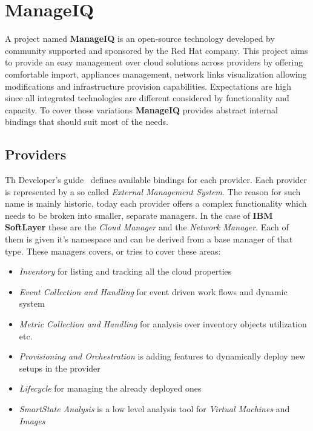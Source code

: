 \chapter{ManageIQ}
\label{chap:ManageIQ}

A project named \textbf{ManageIQ} is an open-source technology developed by community supported and sponsored by the Red Hat company. This project aims to provide an easy management over cloud solutions across providers by offering comfortable import, appliances management, network links visualization allowing modifications and infrastructure provision capabilities. Expectations are high since all integrated technologies are different considered by functionality and capacity. To cover those variations \textbf{ManageIQ} provides abstract internal bindings that should suit most of the needs.

\section{Providers}
\label{sec:Providers}

Th Developer's guide~\cite{manageiq_dev} defines available bindings for each provider. Each provider is represented by a so called \emph{External Management System}. The reason for such name is mainly historic, today each provider offers a complex functionality which needs to be broken into smaller, separate managers. In the case of \textbf{IBM SoftLayer} these are the \emph{Cloud Manager} and the \emph{Network Manager}. Each of them is given it's namespace and can be derived from a base manager of that type. These managers covers, or tries to cover these areas:

\begin{itemize}
	\item \emph{Inventory} for listing and tracking all the cloud properties
	\item \emph{Event Collection and Handling} for event driven work flows and dynamic system
	\item \emph{Metric Collection and Handling} for analysis over inventory objects utilization etc.
	\item \emph{Provisioning and Orchestration} is adding features to dynamically deploy new setups in the provider
	\item \emph{Lifecycle} for managing the already deployed ones
	\item \emph{SmartState Analysis} is a low level analysis tool for \emph{Virtual Machines} and \emph{Images}
\end{itemize}

